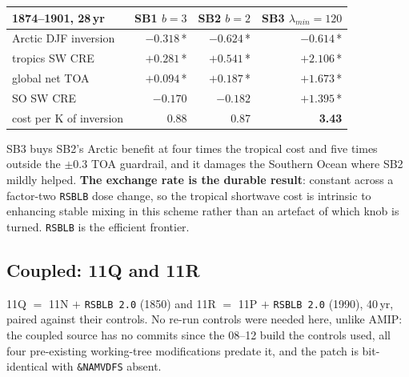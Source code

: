 \documentclass[10pt]{article}
\begin{document}
\begin{center}\small
\begin{tabular}{lrrr}
\toprule
1874--1901, 28\,yr & SB1 $b{=}3$ & SB2 $b{=}2$ & \textbf{SB3} $\lambda_{min}{=}120$ \\
\midrule
Arctic DJF inversion & $-0.318$\,* & $-0.624$\,* & $-0.614$\,* \\
tropics SW CRE & $+0.281$\,* & $+0.541$\,* & $\mathbf{+2.106}$\,* \\
global net TOA & $+0.094$\,* & $+0.187$\,* & $\mathbf{+1.673}$\,* \\
SO SW CRE & $-0.170$ & $-0.182$ & $+1.395$\,* \\
\midrule
cost per K of inversion & 0.88 & 0.87 & \textbf{3.43} \\
\bottomrule
\end{tabular}
\end{center}

SB3 buys SB2's Arctic benefit at four times the tropical cost and five times outside the
$\pm0.3$ TOA guardrail, and it damages the Southern Ocean where SB2 mildly helped.
\textbf{The exchange rate is the durable result}: constant across a factor-two
\texttt{RSBLB} dose change, so the tropical shortwave cost is intrinsic to enhancing stable
mixing in this scheme rather than an artefact of which knob is turned. \texttt{RSBLB} is
the efficient frontier.

\subsection{Coupled: 11Q and 11R}\label{sub:r32coupled}

11Q $=$ 11N $+$ \texttt{RSBLB 2.0} (1850) and 11R $=$ 11P $+$ \texttt{RSBLB 2.0} (1990),
40\,yr, paired against their controls. No re-run controls were needed here, unlike AMIP:
the coupled source has no commits since the 08--12 build the controls used, all four
pre-existing working-tree modifications predate it, and the patch is bit-identical with
\texttt{\&NAMVDFS} absent.
\end{document}
